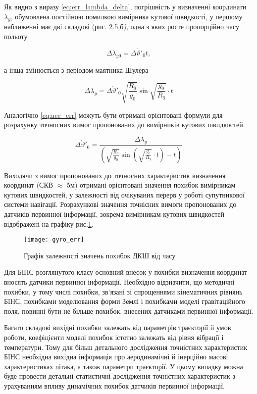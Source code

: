 Як видно з виразу \eqref{eq:err_lambda_delta},  погрішність у визначенні координати  $\lambda _{y} $, обумовлена постійною  помилкою  вимірника кутової швидкості, у першому наближенні має дві складові (рис. 2.5,\textit{б)}, одна  з яких  росте пропорційно  часу польоту

\[\Delta \lambda _{y0} =\Delta \dot{\vartheta }'_{0} t,\] 

а інша  змінюється з періодом маятника Шулера

\[\Delta \lambda _{y} =\Delta \dot{\vartheta }'_{0} \sqrt{\frac{R_{\text{З}} }{g_{0} } } \sin \sqrt{\frac{g_{0} }{R_{\text{З}} } } \cdot t\] 


Аналогічно \eqref{eq:acc_err} можуть бути отримані орієнтовані формули для розрахунку точносних вимог 
пропонованих до вимірників кутових швидкостей.

\[\Delta \dot{\vartheta }'_{0} =\frac{\Delta \lambda _{y} }{\left(\sqrt{\frac{R_{{\text{З}}} }{g_{0} } } \sin \left(\sqrt{\frac{g_{0} }{R_{{\text{З}}} } } \cdot t\right)-t\right)} \] 

Виходячи з вимог пропонованих до точносних характеристик визначення координат (СКВ $\approx$ 5м) 
отримані орієнтовані значення похибок вимірникам кутових швидкостей, у залежності від очікуваних 
перерв у роботі супутникової системи навігації. Розрахункові значення точнісних вимоги пропонованих 
до датчиків первинної інформації, зокрема вимірникам кутових швидкостей відображені на графіку рис.\ref{fig:gyro_err}.

\begin{figure}[here]
\centering
\texttt{[image: gyro\_err]}
\caption{Графік залежності значень похибок ДКШ від часу}
\label{fig:gyro_err}
\end{figure} 

Для БІНС розглянутого класу основний внесок у похибки визначення координат вносять датчики первинної 
інформації. Необхідно відзначити, що методичні похибки, у тому числі похибки, зв'язані зі спрощеннями 
кінематичних рівнянь БІНС, похибками моделювання форми Землі і похибками моделі гравітаційного поля, 
повинні бути не більше  похибок, внесених датчиками первинної інформації.

Багато складові вихідні похибки залежать від параметрів траєкторії й умов роботи, коефіцієнти моделі 
похибок істотно залежать від рівня вібрації і температури. Тому для більш детального дослідження 
точністних характеристик  БІНС необхідна вихідна інформація про аеродинамічні й інерційно масові 
характеристиках літака, а також параметри траєкторії. У цьому випадку можна буде провести детальні 
статистичні дослідження точністних характеристик з урахуванням впливу динамічних похибок датчиків первинної інформації.

